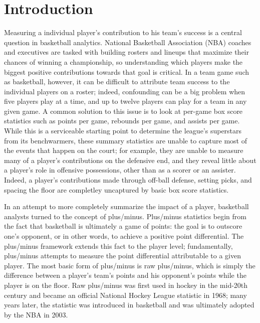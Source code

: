 \chapter{Introduction}
\label{introduction}

Measuring a individual player's contribution to his team's success is a central
question in basketball analytics. National Basketball Association (NBA) coaches
and executives are tasked with building rosters and lineups that maximize their
chances of winning a championship, so understanding which players make the
biggest positive contributions towards that goal is critical. In a team game
such as basketball, however, it can be difficult to attribute team success to
the individual players on a roster; indeed, confounding can be a big problem
when five players play at a time, and up to twelve players can play for a team
in any given game. A common solution to this issue is to look at per-game box
score statistics such as points per game, rebounds per game, and assists per
game. While this is a serviceable starting point to determine the league's
superstars from its benchwarmers, these summary statistics are unable to
capture most of the events that happen on the court; for example, they are
unable to measure many of a player's contributions on the defensive end, and
they reveal little about a player's role in offensive possessions, other than as
a scorer or an assister. Indeed, a player's contributions made through off-ball
defense, setting picks, and spacing the floor are completley uncaptured by
basic box score statistics.

In an attempt to more completely summarize the impact of a player, basketball
analysts turned to the concept of plus/minus. Plus/minus statistics begin from
the fact that basketball is ultimately a game of points: the goal is to outscore
one's opponent, or in other words, to achieve a positive point differential.
The plus/minus framework extends this fact to the player level; fundamentally,
plus/minus attempts to measure the point differential attributable to a given
player. The most basic form of plus/minus is raw plus/minus, which is simply the
difference between a player's team's points and his opponent's points while the
player is on the floor. Raw plus/minus was first used in hockey in the mid-20th
century and became an official National Hockey League statistic in 1968; many
years later, the statistic was introduced in basketball and was ultimately
adopted by the NBA in 2003.

